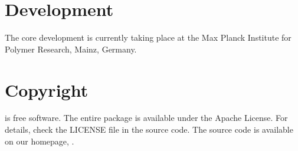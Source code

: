 \section*{Development}
The core development is currently taking place at the Max Planck Institute for Polymer Research, Mainz, Germany.

\section*{Copyright}
\votcactp is free software. The entire package is available under the Apache License. For details, check
the LICENSE file in the source code. The \votcactp source code is available on our homepage, .

\vfill
